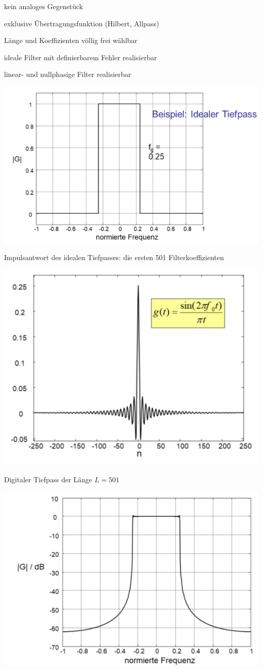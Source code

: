 \documentclass[a4paper]{article}
\begin{document}
\begin{multicols}{3}
  \begin{itemize*}
    \item kein analoges Gegenstück
    \item exklusive Übertragungsfunktion (Hilbert, Allpass)
    \item Länge und Koeffizienten völlig frei wählbar
    \item ideale Filter mit definierbarem Fehler realisierbar
    \item linear- und nullphasige Filter realisierbar
    \item \includegraphics[width=.5\linewidth]{Assets/Biosignalverarbeitung-fir-tiefpass.png}
    \item Impulsantwort des idealen Tiefpasses: die ersten 501 Filterkoeffizienten
    \begin{itemize*}
      \item \includegraphics[width=.5\linewidth]{Assets/Biosignalverarbeitung-fir-tiefpass-2.png}
    \end{itemize*}
    \item Digitaler Tiefpass der Länge $L=501$
    \begin{itemize*}
      \item \includegraphics[width=.5\linewidth]{Assets/Biosignalverarbeitung-fir-tiefpass-3.png}

\end{itemize*}
\end{itemize*}
\end{multicols}
\end{document}
